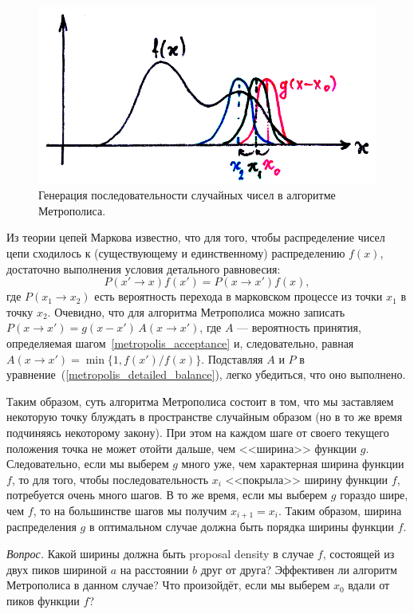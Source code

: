 \documentclass{book}
\begin{document}
\begin{figure}
	\includegraphics[width=0.8\linewidth]{metropolis.png}
    \caption{\label{dots-for-monte-carlo}Генерация последовательности случайных чисел в алгоритме
    Метрополиса.}
\end{figure}

Из теории цепей Маркова известно, что для того, чтобы распределение чисел цепи сходилось к
(существующему и единственному) распределению $f(x)$, достаточно выполнения
условия детального равновесия:
\begin{equation}
    \label{metropolis_detailed_balance}
    P(x' \to x) f(x') = P(x \to x') f(x),
\end{equation}
где $P(x_1 \to x_2)$ есть вероятность перехода в марковском процессе из точки $x_1$ в точку $x_2$.
Очевидно, что для алгоритма Метрополиса можно записать $P(x \to x') = g(x - x') \, A(x \to x')$, где
$A$ --- вероятность принятия, определяемая шагом~\ref{metropolis_acceptance} и, следовательно,
равная $A(x \to x') = \min \{1, f(x') / f(x) \}$. Подставляя $A$ и $P$ в
уравнение~(\ref{metropolis_detailed_balance}), легко убедиться, что оно выполнено.

Таким образом, суть алгоритма Метрополиса состоит в том, что мы заставляем некоторую точку блуждать
в пространстве случайным образом (но в то же время подчиняясь некоторому закону). При этом на
каждом шаге от своего текущего положения точка не может отойти дальше, чем <<ширина>> функции $g$.
Следовательно, если мы выберем $g$ много уже, чем характерная ширина функции $f$, то для того,
чтобы последовательность $x_i$ <<покрыла>> ширину функции $f$, потребуется очень много шагов. В то
же время, если мы выберем $g$ гораздо шире, чем $f$, то на большинстве шагов мы получим $x_{i + 1}
= x_i$. Таким образом, ширина распределения $g$ в оптимальном случае должна быть порядка ширины
функции $f$.

\textit{Вопрос.} Какой ширины должна быть proposal density в случае $f$, состоящей из двух пиков
шириной $a$ на расстоянии $b$ друг от друга? Эффективен ли алгоритм Метрополиса в данном случае?
Что произойдёт, если мы выберем $x_0$ вдали от пиков функции $f$?
\end{document}
